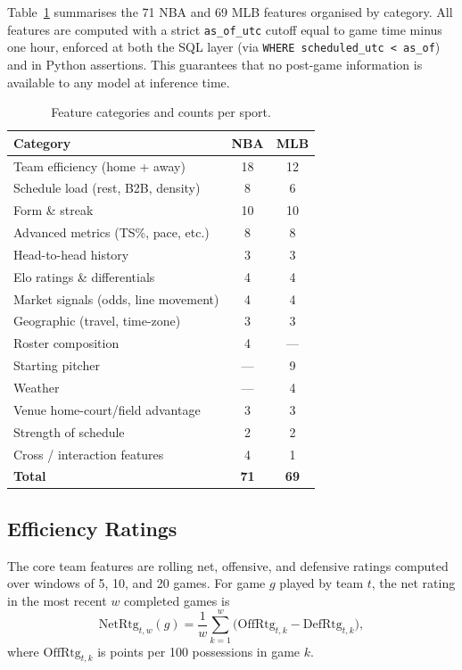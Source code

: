 \documentclass[conference]{IEEEtran}
\begin{document}
Table~\ref{tab:features} summarises the 71 NBA and 69 MLB features
organised by category.  All features are computed with a strict
\texttt{as\_of\_utc} cutoff equal to game time minus one hour,
enforced at both the SQL layer (via \texttt{WHERE scheduled\_utc <
as\_of}) and in Python assertions.  This guarantees that no
post-game information is available to any model at inference time.

\begin{table}[t]
\centering
\caption{Feature categories and counts per sport.}
\label{tab:features}
\small
\begin{tabular}{lcc}
\toprule
\textbf{Category} & \textbf{NBA} & \textbf{MLB} \\
\midrule
Team efficiency (home + away) & 18 & 12 \\
Schedule load (rest, B2B, density) & 8 & 6 \\
Form \& streak & 10 & 10 \\
Advanced metrics (TS\%, pace, etc.) & 8 & 8 \\
Head-to-head history & 3 & 3 \\
Elo ratings \& differentials & 4 & 4 \\
Market signals (odds, line movement) & 4 & 4 \\
Geographic (travel, time-zone) & 3 & 3 \\
Roster composition & 4 & — \\
Starting pitcher & — & 9 \\
Weather & — & 4 \\
Venue home-court/field advantage & 3 & 3 \\
Strength of schedule & 2 & 2 \\
Cross / interaction features & 4 & 1 \\
\midrule
\textbf{Total} & \textbf{71} & \textbf{69} \\
\bottomrule
\end{tabular}
\end{table}

\subsection{Efficiency Ratings}
The core team features are rolling net, offensive, and defensive
ratings computed over windows of 5, 10, and 20 games.  For game $g$
played by team $t$, the net rating in the most recent $w$ completed
games is
\begin{equation}
\text{NetRtg}_{t,w}(g)=\frac{1}{w}\sum_{k=1}^{w}
  \bigl(\text{OffRtg}_{t,k}-\text{DefRtg}_{t,k}\bigr),
\label{eq:netrtg}
\end{equation}
where $\text{OffRtg}_{t,k}$ is points per 100 possessions in game $k$.
\end{document}
